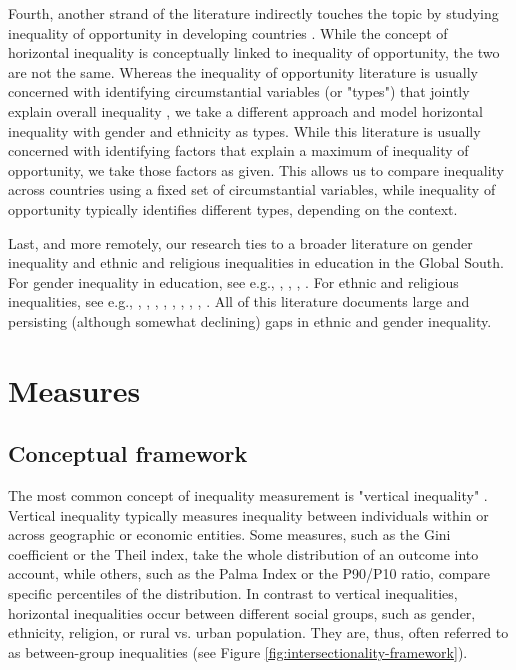 Fourth, another strand of the literature indirectly touches the topic by studying inequality of opportunity in developing countries \citep{Ferreira2018, Brunori2019}. While the concept of horizontal inequality is conceptually linked to inequality of opportunity, the two are not the same. Whereas the inequality of opportunity literature is usually concerned with identifying circumstantial variables (or "types") that jointly explain overall inequality \citep[see e.g.,][]{Brunori2021}, we take a different approach and model horizontal inequality with gender and ethnicity as types.  While this literature is usually concerned with identifying factors that explain a maximum of inequality of opportunity, we take those factors as given. This allows us to compare inequality across countries using a fixed set of circumstantial variables, while inequality of opportunity typically identifies different types, depending on the context.

Last, and more remotely, our research ties to a broader literature on gender inequality and ethnic and religious inequalities in education in the Global South. For gender inequality in education, see e.g., \cite{King1995}, \cite{Lopus2018}, \cite{Klasen2002}, \cite{Klasen2009}. For ethnic and religious inequalities, see e.g., \cite{Easterly1997}, \cite{Montalvo2003}, \cite{Montalvo2005}, \cite{Alesina2016}, \cite{Houle2017}, \cite{Muller2017}, \cite{Alcorta2018}, \cite{Cooray2011}, \cite{Hajj2009}. All of this literature documents large and persisting (although somewhat declining) gaps in ethnic and gender inequality.


\hypertarget{measures}{%
\section{Measures}\label{measures}}

\hypertarget{conceptual-framework}{%
\subsection{Conceptual framework}\label{conceptual-framework}}

The most common concept of inequality measurement is "vertical inequality" \citep{Bourguignon1979, Cowell1988, Lambert1993}. Vertical inequality typically measures inequality between individuals within or across geographic or economic entities. Some measures, such as the Gini coefficient or the Theil index, take the whole distribution of an outcome into account, while others, such as the Palma Index or the P90/P10 ratio, compare specific percentiles of the distribution. In contrast to vertical inequalities, horizontal inequalities occur between different social groups, such as gender, ethnicity, religion, or rural vs. urban population. They are, thus, often referred to as between-group inequalities (see Figure \ref{fig:intersectionality-framework}). 

